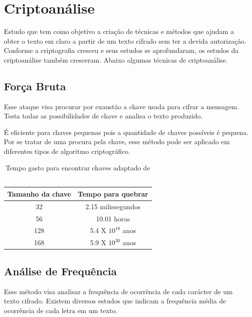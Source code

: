 %
\section{Criptoanálise}
\label{cryptanalysis}

Estudo que tem como objetivo a criação de técnicas e métodos que ajudam a obter o texto em claro a partir de um texto cifrado sem ter a devida autorização. Conforme a criptografia cresceu e seus estudos se aprofundaram, os estudos da criptoanálise também cresceram. Abaixo algumas técnicas de criptoanálise.

\subsection{Força Bruta}
\label{brute-force}

Esse ataque visa procurar por exaustão a chave usada para cifrar a mensagem. Testa todas as possibilidades de chave e analisa o texto produzido. 

É eficiente para chaves pequenas pois a quantidade de chaves possíveis é pequena. Por se tratar de uma procura pela chave, esse método pode ser aplicado em diferentes tipos de algoritmo criptográfico.

\begin{table}[h]
\centering
	\begin{tabular}{|c|c|}
		\hline
		Tamanho da chave & Tempo para quebrar \\ \hline
		32 & 2.15 milissegundos \\ \hline
		56 & 10.01 horas \\ \hline
		128 & 5.4 X $ 10 ^{18}$ anos \\ \hline
		168 & 5.9 X $ 10 ^{30}$ anos \\ \hline
	\end{tabular}
\caption[{Tempo gasto para encontrar chaves}] {Tempo gasto para encontrar chaves adaptado de ~\cite{william-stallings}}
\end{table}

\subsection{Análise de Frequência}
\label{frequency-analysis}

Esse método visa analisar a frequência de ocorrência de cada carácter de um texto cifrado. Existem diversos estudos que indicam a frequência média de ocorrência de cada letra em um texto. 

